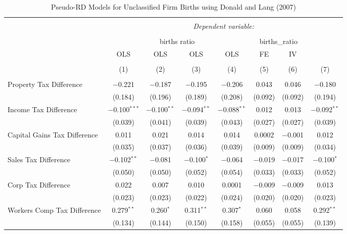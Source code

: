 
\begin{table}[!htbp] \centering 
  \caption{Pseudo-RD Models for  Unclassified Firm Births using Donald and Lang (2007)} 
  \label{} 
\begin{tabular}{@{\extracolsep{5pt}}lccccccc} 
\\[-1.8ex]\hline 
\hline \\[-1.8ex] 
 & \multicolumn{7}{c}{\textit{Dependent variable:}} \\ 
\cline{2-8} 
\\[-1.8ex] & \multicolumn{4}{c}{births ratio} & \multicolumn{2}{c}{births\_ratio} &   \\ 
 & OLS & OLS & OLS & OLS & FE & IV &  \\ 
\\[-1.8ex] & (1) & (2) & (3) & (4) & (5) & (6) & (7)\\ 
\hline \\[-1.8ex] 
 Property Tax Difference & $-$0.221 & $-$0.187 & $-$0.195 & $-$0.206 & 0.043 & 0.046 & $-$0.180 \\ 
  & (0.184) & (0.196) & (0.189) & (0.208) & (0.092) & (0.092) & (0.194) \\ 
  Income Tax Difference & $-$0.100$^{***}$ & $-$0.100$^{**}$ & $-$0.094$^{**}$ & $-$0.088$^{**}$ & 0.012 & 0.013 & $-$0.092$^{**}$ \\ 
  & (0.039) & (0.041) & (0.039) & (0.043) & (0.027) & (0.027) & (0.039) \\ 
  Capital Gains Tax Difference & 0.011 & 0.021 & 0.014 & 0.014 & 0.0002 & $-$0.001 & 0.012 \\ 
  & (0.035) & (0.037) & (0.036) & (0.039) & (0.009) & (0.009) & (0.034) \\ 
  Sales Tax Difference & $-$0.102$^{**}$ & $-$0.081 & $-$0.100$^{*}$ & $-$0.064 & $-$0.019 & $-$0.017 & $-$0.100$^{*}$ \\ 
  & (0.050) & (0.050) & (0.052) & (0.054) & (0.033) & (0.033) & (0.052) \\ 
  Corp Tax Difference & 0.022 & 0.007 & 0.010 & 0.0001 & $-$0.009 & $-$0.009 & 0.013 \\ 
  & (0.023) & (0.023) & (0.022) & (0.024) & (0.020) & (0.020) & (0.023) \\ 
  Workers Comp Tax Difference & 0.279$^{**}$ & 0.260$^{*}$ & 0.311$^{**}$ & 0.307$^{*}$ & 0.060 & 0.058 & 0.292$^{**}$ \\ 
  & (0.134) & (0.144) & (0.150) & (0.158) & (0.055) & (0.055) & (0.139) \\ 

\end{tabular}
\end{table}
